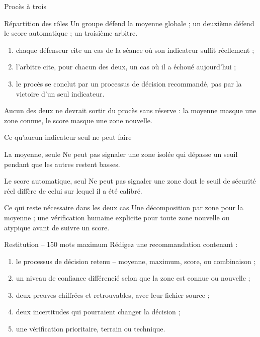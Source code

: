 \documentclass[aspectratio=169]{beamer}
\begin{document}
\begin{frame}{Procès à trois}
  \begin{block}{Répartition des rôles}
    Un groupe défend la moyenne globale ; un deuxième défend le score automatique ; un troisième arbitre.
  \end{block}
  \begin{enumerate}
    \item chaque défenseur cite un cas de la séance où son indicateur suffit réellement ;
    \item l'arbitre cite, pour chacun des deux, un cas où il a échoué aujourd'hui ;
    \item le procès se conclut par un processus de décision recommandé, pas par la victoire d'un seul indicateur.
  \end{enumerate}
  \alert{Aucun des deux ne devrait sortir du procès sans réserve : la moyenne masque une zone connue, le score masque une zone nouvelle.}
\end{frame}

\begin{frame}{Ce qu'aucun indicateur seul ne peut faire}
  \begin{block}{La moyenne, seule}
    Ne peut pas signaler une zone isolée qui dépasse un seuil pendant que les autres restent basses.
  \end{block}
  \begin{block}{Le score automatique, seul}
    Ne peut pas signaler une zone dont le seuil de sécurité réel diffère de celui sur lequel il a été calibré.
  \end{block}
  \begin{alertblock}{Ce qui reste nécessaire dans les deux cas}
    Une décomposition par zone pour la moyenne ; une vérification humaine explicite pour toute zone nouvelle ou atypique avant de suivre un score.
  \end{alertblock}
\end{frame}

\begin{frame}{Restitution -- 150 mots maximum}
  Rédigez une recommandation contenant :
  \begin{enumerate}
    \item le processus de décision retenu -- moyenne, maximum, score, ou combinaison ;
    \item un niveau de confiance différencié selon que la zone est connue ou nouvelle ;
    \item deux preuves chiffrées et retrouvables, avec leur fichier source ;
    \item deux incertitudes qui pourraient changer la décision ;
    \item une vérification prioritaire, terrain ou technique.
  \end{enumerate}
\end{frame}
\end{document}
